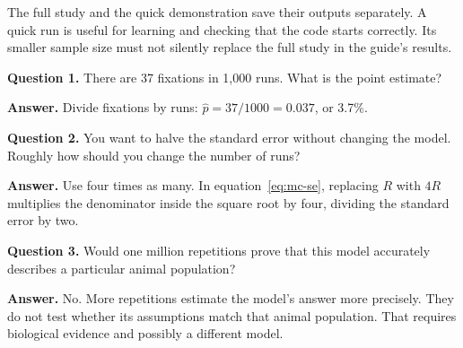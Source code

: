 The full study and the quick demonstration save their outputs separately. A quick run is useful for learning and checking that the code starts correctly. Its smaller sample size must not silently replace the full study in the guide's results.

\begin{checkpoint}
\textbf{Question 1.} There are 37 fixations in 1,000 runs. What is the point estimate?

\textbf{Answer.} Divide fixations by runs: $\widehat p=37/1000=0.037$, or 3.7\%.

\medskip
\textbf{Question 2.} You want to halve the standard error without changing the model. Roughly how should you change the number of runs?

\textbf{Answer.} Use four times as many. In equation~\eqref{eq:mc-se}, replacing $R$ with $4R$ multiplies the denominator inside the square root by four, dividing the standard error by two.

\medskip
\textbf{Question 3.} Would one million repetitions prove that this model accurately describes a particular animal population?

\textbf{Answer.} No. More repetitions estimate the model's answer more precisely. They do not test whether its assumptions match that animal population. That requires biological evidence and possibly a different model.
\end{checkpoint}

